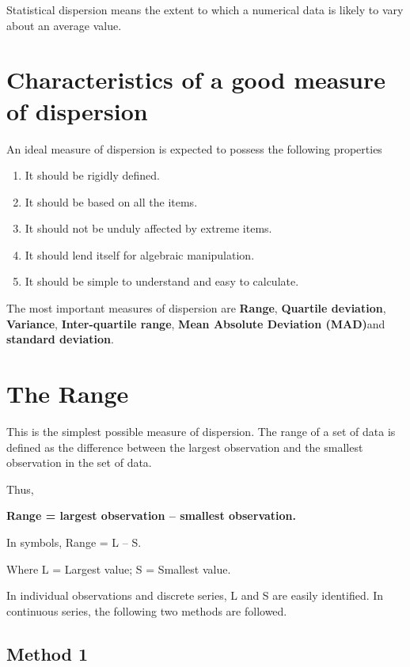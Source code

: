 \documentclass[
]{book}
\begin{document}
Statistical dispersion means the extent to which a numerical data is
likely to vary about an average value.

\hypertarget{characteristics-of-a-good-measure-of-dispersion}{%
\section{Characteristics of a good measure of dispersion}\label{characteristics-of-a-good-measure-of-dispersion}}

An ideal measure of dispersion is expected to possess the following
properties

\begin{enumerate}
\def\labelenumi{\arabic{enumi}.}
\item
  It should be rigidly defined.
\item
  It should be based on all the items.
\item
  It should not be unduly affected by extreme items.
\item
  It should lend itself for algebraic manipulation.
\item
  It should be simple to understand and easy to calculate.
\end{enumerate}

The most important measures of dispersion are \textbf{Range}, \textbf{Quartile
deviation}, \textbf{Variance}, \textbf{Inter-quartile range}, \textbf{Mean Absolute
Deviation (MAD)}and \textbf{standard deviation}.

\hypertarget{the-range}{%
\section{The Range}\label{the-range}}

This is the simplest possible measure of dispersion. The range of a set
of data is defined as the difference between the largest observation and
the smallest observation in the set of data.

Thus,

\textbf{Range = largest observation -- smallest observation.}

In symbols, Range = L -- S.

Where L = Largest value; S = Smallest value.

In individual observations and discrete series, L and S are easily
identified. In continuous series, the following two methods are
followed.

\hypertarget{method-1}{%
\subsection{Method 1}\label{method-1}}
\end{document}
